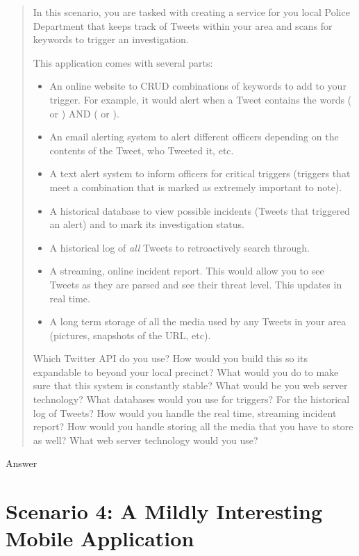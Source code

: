 \documentclass[12pt, letterpaper]{homework}
\begin{document}
\begin{quote}
    In this scenario, you are tasked with creating a service for you local Police
    Department that keeps track of Tweets within your area and scans for keywords to
    trigger an investigation.

    This application comes with several parts:
    \begin{itemize}
        \item An online website to CRUD combinations of keywords to add to your
            trigger. For example, it would alert when a Tweet contains the words
            ( or ) AND ( or
            ).
        \item An email alerting system to alert different officers depending on the
            contents of the Tweet, who Tweeted it, etc.
        \item A text alert system to inform officers for critical triggers (triggers
            that meet a combination that is marked as extremely important to note).
        \item A historical database to view possible incidents (Tweets that
            triggered an alert) and to mark its investigation status.
        \item A historical log of \textit{all} Tweets to retroactively search
            through.
        \item A streaming, online incident report. This would allow you to see
            Tweets as they are parsed and see their threat level. This updates in
            real time.
        \item A long term storage of all the media used by any Tweets in your area
            (pictures, snapshots of the URL, etc).
    \end{itemize}

    Which Twitter API do you use? How would you build this so its expandable to
    beyond your local precinct? What would you do to make sure that this system is
    constantly stable? What would be you web server technology? What databases would
    you use for triggers? For the historical log of Tweets? How would you handle the
    real time, streaming incident report? How would you handle storing all the media
    that you have to store as well? What web server technology would you use?
\end{quote}

Answer %

\section*{Scenario 4: A Mildly Interesting Mobile Application}
\end{document}
